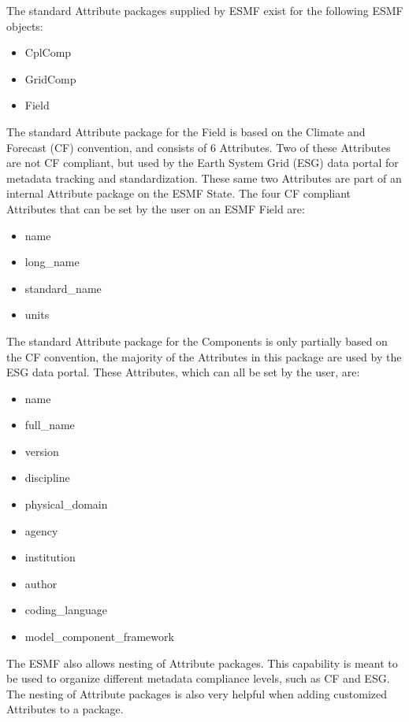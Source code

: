 The standard Attribute packages supplied by ESMF exist for the following ESMF objects:

\begin{itemize}
\item CplComp
\item GridComp
\item Field
\end{itemize}

The standard Attribute package for the Field is based on the Climate and Forecast (CF) convention, and consists of 6 Attributes.  Two of these Attributes are not CF compliant, but used by the Earth System Grid (ESG) data portal for metadata tracking and standardization.  These same two Attributes are part of an internal Attribute package on the ESMF State.  The four CF compliant Attributes that can be set by the user on an ESMF Field are:

\begin{itemize}
\item name
\item long\_name
\item standard\_name
\item units
\end{itemize}

The standard Attribute package for the Components is only partially based on the CF convention, the majority of the Attributes in this package are used by the ESG data portal.  These Attributes, which can all be set by the user, are:

\begin{itemize}
\item name
\item full\_name
\item version
\item discipline
\item physical\_domain
\item agency
\item institution
\item author
\item coding\_language
\item model\_component\_framework
\end{itemize}

The ESMF also allows nesting of Attribute packages.  This capability is meant to be used to organize different metadata compliance levels, such as CF and ESG.  The nesting of Attribute packages is also very helpful when adding customized Attributes to a package.  

